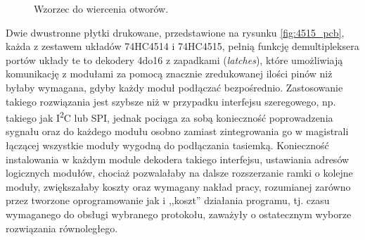 \begin{figure}
 \centering
 \makebox[\textwidth][r]{
    \def\svgwidth{\textwidth}
    
  }
 \caption{Wzorzec do wiercenia otworów.}
 \label{fig:holes_master}
\end{figure}

Dwie dwustronne płytki drukowane, przedstawione na rysunku \ref{fig:4515_pcb}, każda z zestawem układów 74HC4514 i 74HC4515, pełnią funkcję demultipleksera portów \pauza układy te to dekodery 4\ppauza{}do\ppauza{}16 z zapadkami (\textsl{latches}), które umożliwiają komunikację z modułami za pomocą znacznie zredukowanej ilości pinów niż byłaby wymagana, gdyby każdy moduł podłączać bezpośrednio.
Zastosowanie takiego rozwiązania jest szybsze niż w przypadku interfejsu szeregowego, np. takiego jak I\textsuperscript{2}C lub SPI, jednak pociąga za sobą konieczność poprowadzenia sygnału  oraz  do każdego modułu osobno zamiast zintegrowania go w magistrali łączącej wszystkie moduły wygodną do podłączania tasiemką.
Konieczność instalowania w każdym module dekodera takiego interfejsu, ustawiania adresów logicznych modułów, chociaż pozwalałaby na dalsze rozszerzanie ramki o kolejne moduły, zwiększałaby koszty oraz wymagany nakład pracy, rozumianej zarówno przez tworzone oprogramowanie jak i ,,koszt'' działania programu, tj. czasu wymaganego do obsługi wybranego protokołu, zaważyły o ostatecznym wyborze rozwiązania równoległego.

